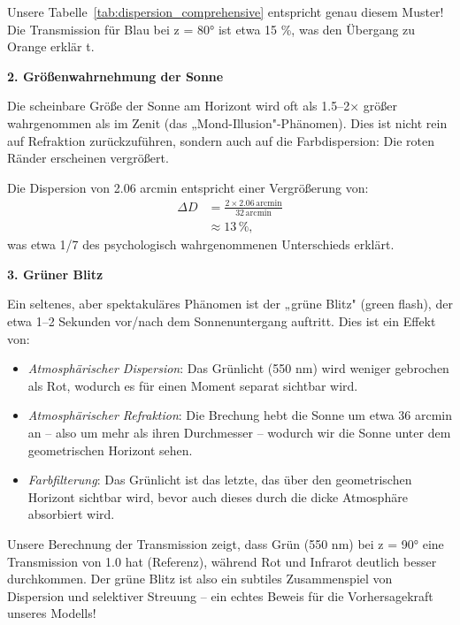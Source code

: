 \documentclass[12pt,a4paper]{article}
\begin{document}
Unsere Tabelle~\ref{tab:dispersion_comprehensive} entspricht genau diesem Muster!
Die Transmission für Blau bei z = 80° ist etwa 15 \%, was den Übergang zu Orange erklär t.

\textbf{2. Größenwahrnehmung der Sonne}

Die scheinbare Größe der Sonne am Horizont wird oft als 1.5–2× größer
wahrgenommen als im Zenit (das „Mond-Illusion"-Phänomen). Dies ist
nicht rein auf Refraktion zurückzuführen, sondern auch auf die
Farbdispersion: Die roten Ränder erscheinen vergrößert.

Die Dispersion von 2.06 arcmin entspricht einer Vergrößerung von:
\begin{equation}
  \begin{aligned}
  \Delta D
  &= \frac{2 \times 2.06\,\text{arcmin}}{32\,\text{arcmin}} \\
  &\approx 13\,\%,
  \end{aligned}
	\label{eq:size_increase}
\end{equation}
was etwa 1/7 des psychologisch wahrgenommenen Unterschieds erklärt.

\textbf{3. Grüner Blitz}

Ein seltenes, aber spektakuläres Phänomen ist der „grüne Blitz" (green flash),
der etwa 1–2 Sekunden vor/nach dem Sonnenuntergang auftritt. Dies ist
ein Effekt von:
\begin{itemize}
	\item \emph{Atmosphärischer Dispersion}: Das Grünlicht (550 nm) wird
	weniger gebrochen als Rot, wodurch es für einen Moment separat sichtbar wird.
	
	\item \emph{Atmosphärischer Refraktion}: Die Brechung hebt die Sonne
	um etwa 36 arcmin an – also um mehr als ihren Durchmesser – wodurch
	wir die Sonne unter dem geometrischen Horizont sehen.
	
	\item \emph{Farbfilterung}: Das Grünlicht ist das letzte, das über
	den geometrischen Horizont sichtbar wird, bevor auch dieses durch
	die dicke Atmosphäre absorbiert wird.
\end{itemize}

Unsere Berechnung der Transmission zeigt, dass Grün (550 nm) bei z = 90°
eine Transmission von 1.0 hat (Referenz), während Rot und Infrarot
deutlich besser durchkommen. Der grüne Blitz ist also ein subtiles Zusammenspiel
von Dispersion und selektiver Streuung – ein echtes Beweis für die Vorhersagekraft
unseres Modells!
\end{document}
